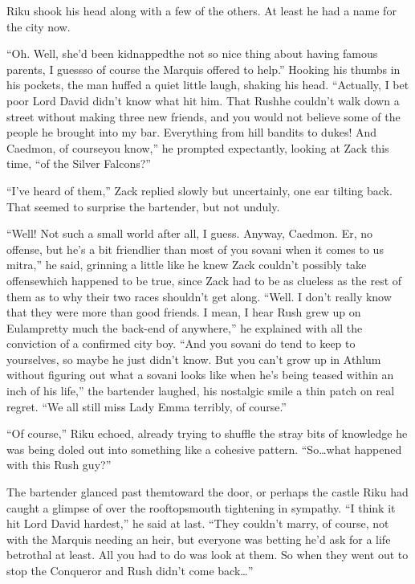 Riku shook his head along with a few of the others. At least he had a name for the city now.

``Oh. Well, she'd been kidnapped\textemdash the not so nice thing about having famous parents, I guess\textemdash so of course the Marquis offered to help.'' Hooking his thumbs in his pockets, the man huffed a quiet little laugh, shaking his head. ``Actually, I bet poor Lord David didn't know what hit him. That Rush\textemdash he couldn't walk down a street without making three new friends, and you would not believe some of the people he brought into my bar. Everything from hill bandits to dukes! And Caedmon, of course\textemdash you know,'' he prompted expectantly, looking at Zack this time, ``of the Silver Falcons?''

``I've heard of them,'' Zack replied slowly but uncertainly, one ear tilting back. That seemed to surprise the bartender, but not unduly.

``Well! Not such a small world after all, I guess. Anyway, Caedmon. Er, no offense, but he's a bit friendlier than most of you sovani when it comes to us mitra,'' he said, grinning a little like he knew Zack couldn't possibly take offense\textemdash which happened to be true, since Zack had to be as clueless as the rest of them as to why their two races shouldn't get along. ``Well. I don't really know that they were more than good friends. I mean, I hear Rush grew up on Eulam\textemdash pretty much the back-end of anywhere,'' he explained with all the conviction of a confirmed city boy. ``And you sovani do tend to keep to yourselves, so maybe he just didn't know. But you can't grow up in Athlum without figuring out what a sovani looks like when he's being teased within an inch of his life,'' the bartender laughed, his nostalgic smile a thin patch on real regret. ``We all still miss Lady Emma terribly, of course.''

``Of course,'' Riku echoed, already trying to shuffle the stray bits of knowledge he was being doled out into something like a cohesive pattern. ``So\ldots what happened with this Rush guy?''

The bartender glanced past them\textemdash toward the door, or perhaps the castle Riku had caught a glimpse of over the rooftops\textemdash mouth tightening in sympathy. ``I think it hit Lord David hardest,'' he said at last. ``They couldn't marry, of course, not with the Marquis needing an heir, but everyone was betting he'd ask for a life betrothal at least. All you had to do was look at them. So when they went out to stop the Conqueror and Rush didn't come back\ldots ''

